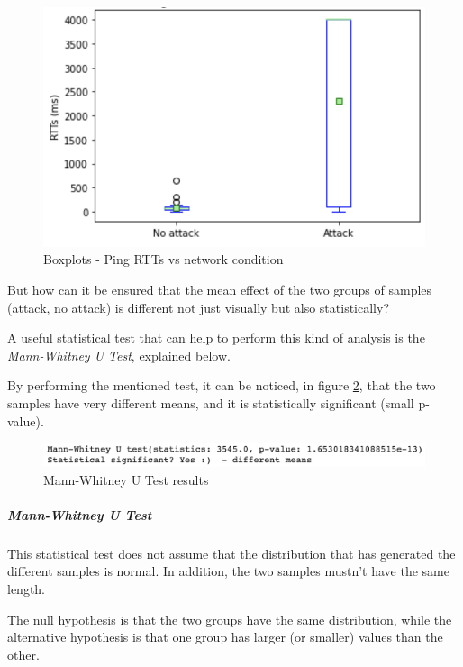 \documentclass[fleqn, 11pt]{SelfArx} %
\begin{document}
\begin{figure}[H]
	\centering
    \includegraphics[width=\linewidth]{./ping/ping-boxplot1.png}
    \caption{Boxplots - Ping RTTs vs network condition}
	\label{fig:ping-boxplot1}%
\end{figure}

But how can it be ensured that the mean effect of the two groups of samples (attack, no attack) is different not just visually but also statistically\mbox{?}

A useful statistical test that can help to perform this kind of analysis is the {\it{Mann-Whitney U Test}}, explained below. \newline

By performing the mentioned test, it can be noticed, in figure \ref{fig:mannwhitneyu1}, that the two samples have very different means, and it is statistically significant (small p-value).

\begin{figure}[H]\centering
    \includegraphics[width=\linewidth]{./ping/mannwhitneyu1.png}
    \caption{Mann-Whitney U Test results}
	\label{fig:mannwhitneyu1}
\end{figure}

\subparagraph{Mann-Whitney U Test \cite{MannWhitneyU}}
This statistical test does not assume that the distribution that has generated the different samples is normal.
In addition, the two samples mustn't have the same length.

The null hypothesis is that the two groups have the same distribution, while the alternative hypothesis is that one group has larger (or smaller) values than the other.\\
\end{document}

